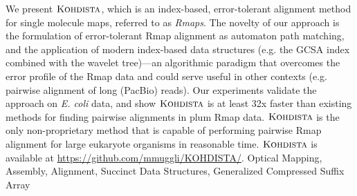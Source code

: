 \documentclass[letterpaper]{gbe}
\def\dopp{\mbox{\rm {\sc Kohdista}}}
\begin{document}
\begin{gbeabstract}
  {We present $\dopp$, which is an index-based, error-tolerant alignment method for single molecule maps, referred to as {\em Rmaps}.  The novelty of our approach is the formulation of error-tolerant Rmap alignment as automaton path matching, and the application of modern index-based data structures (e.g. the GCSA index combined with the wavelet tree)---an algorithmic paradigm that overcomes the error profile of the Rmap data and could serve useful in other contexts (e.g. pairwise alignment of long (PacBio) reads). Our experiments validate the approach on {\em E. coli} data, and show $\dopp$ is at least 32x faster than existing methods for finding pairwise alignments in plum Rmap data. $\dopp$ is the only non-proprietary method that is capable of performing pairwise Rmap alignment for large eukaryote organisms in reasonable time.   $\dopp$ is available at \url{https://github.com/mmuggli/KOHDISTA/}.}
{Optical Mapping, Assembly, Alignment, Succinct Data Structures, Generalized Compressed Suffix Array\vspace*{15pt}}
\end{gbeabstract}
\end{document}
